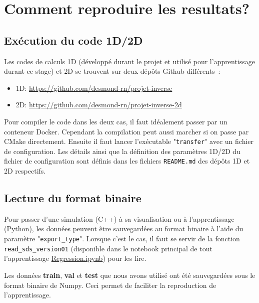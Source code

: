 

\chapter{Comment reproduire les resultats?} %

\label{AppendixA} %

\section{Exécution du code 1D/2D}

Les codes de calculs 1D (développé durant le projet et utilisé pour l'apprentissage durant ce stage) et 2D se trouvent sur deux dépôts Github différents :
\begin{itemize}
 \item 1D: \url{https://github.com/desmond-rn/projet-inverse} 
 \item 2D: \url{https://github.com/desmond-rn/projet-inverse-2d}
\end{itemize}

Pour compiler le code dans les deux cas, il faut idéalement passer par un conteneur Docker. Cependant la compilation peut aussi marcher si on passe par CMake directement.
Ensuite il faut lancer l'exécutable "\verb|transfer|" avec un fichier de configuration. Les détails ainsi que la définition des paramètres 1D/2D du fichier de configuration sont définis dans les fichiers \verb|README.md| des dépôts 1D et 2D respectifs.

\section{Lecture du format binaire}
Pour passer d'une simulation (C++) à sa visualisation ou à l'apprentissage (Python), les données peuvent être sauvegardées au format binaire à l'aide du paramètre "\verb|export_type|". Lorsque c'est le cas, il faut se servir de la fonction \verb|read_sds_version01| (disponible dans le notebook principal de tout l'apprentissage \href{https://colab.research.google.com/drive/18oCXoZzY0_7XnEmHBzHH40vVVnIacoVc?usp=sharing}{Regression.ipynb}) pour les lire.

Les données \textbf{train}, \textbf{val} et \textbf{test} que nous avons utilisé ont été sauvegardées sous le format binaire de Numpy. Ceci permet de faciliter la reproduction de l'apprentissage.


